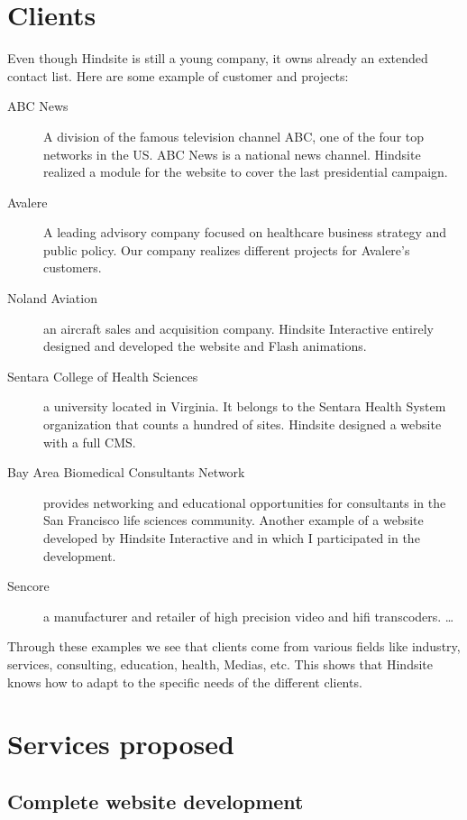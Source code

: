 \section{Clients}

Even though Hindsite is still a young company, it owns already an extended contact
list. Here are some example of customer and projects:


\begin{description}
  \item[ABC News]A division of the famous television channel ABC, one of the
four top networks in the US. ABC News is a national news channel. Hindsite
realized a module for the website to cover the last presidential campaign.
  \item[Avalere]A leading advisory company focused on healthcare business
strategy and public policy. Our company realizes different projects for
Avalere’s customers.
  \item[Noland Aviation] an aircraft sales and acquisition company. Hindsite
Interactive entirely designed and developed the website and Flash animations.
  \item[Sentara College of Health Sciences] a university located in Virginia. It
belongs to the Sentara Health System organization that counts a hundred of
sites. Hindsite designed a website with a full CMS.
  \item[Bay Area Biomedical Consultants Network] provides
networking and educational opportunities for consultants in the San Francisco
life sciences community. Another example of a website developed by Hindsite
Interactive and in which I participated in the development.
  \item[Sencore] a manufacturer and retailer of high precision video and hifi transcoders.
\ldots
\end{description}


Through these examples we see that clients come from various fields like
industry, services, consulting, education, health, Medias, etc.
This shows that Hindsite knows how to adapt to the specific needs of the
different clients.

\section{Services proposed}

\subsection{Complete website development}

